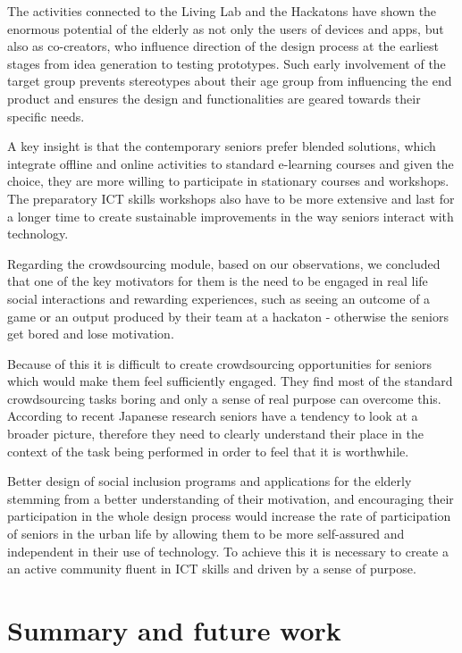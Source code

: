 \documentclass[sigconf]{acmart}
\begin{document}
The activities connected to the Living Lab and the Hackatons have shown the enormous potential of the elderly as not only the users of devices and apps, but also as co-creators, who influence direction of the design process at the earliest stages from idea generation to testing prototypes. Such early involvement of the target group prevents stereotypes about their age group from influencing the end product and ensures the design and functionalities are geared towards their specific needs. 

A key insight is that the contemporary seniors prefer blended solutions, which integrate offline and online activities to standard e-learning courses and given the choice, they are more willing to participate in stationary courses and workshops. The preparatory ICT skills workshops also have to be more extensive and last for a longer time to create sustainable improvements in the way seniors interact with technology.

Regarding the crowdsourcing module, based on our observations, we concluded that one of the key motivators for them is the need to be engaged in real life social interactions and rewarding experiences, such as seeing an outcome of a game or an output produced by their team at a hackaton - otherwise the seniors get bored and lose motivation. 

Because of this it is difficult to create crowdsourcing opportunities for seniors which would make them feel sufficiently engaged. They find most of the standard crowdsourcing tasks boring and only a sense of real purpose can overcome this. According to recent Japanese research seniors have a tendency to look at a broader picture, therefore they need to clearly understand their place in the context of the task being performed in order to feel that it is worthwhile. 

Better design of social inclusion programs and applications for the elderly stemming from a better understanding of their motivation, and encouraging their participation in the whole design process would increase the rate of participation of seniors in the urban life by allowing them to be more self-assured and independent in their use of technology. To achieve this it is necessary to create a an active community fluent in ICT skills and driven by a sense of purpose.

\section{Summary and future work}
\end{document}
